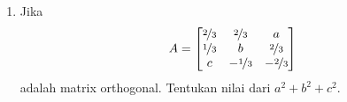 \begin{enumerate}
\item Jika $$A=\begin{bmatrix}\nicefrac{2}{3} & \nicefrac{2}{3} & a\\ \nicefrac{1}{3} & b & \nicefrac{2}{3}\\ c & -\nicefrac{1}{3} & -\nicefrac{2}{3}\end{bmatrix}$$ adalah matrix orthogonal. Tentukan nilai dari $a^2+b^2+c^2$.
\end{enumerate}
